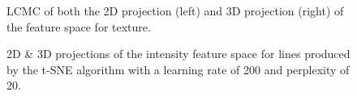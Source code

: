 \begin{figure}[H]
	\centering
	\caption{LCMC of both the 2D projection (left) and 3D projection (right) of the feature space for texture.}\label{fig:LCMC_texture}
\end{figure}
\clearpage


\clearpage
\begin{figure}[H]
	\centering
	\caption{2D \& 3D projections of the intensity feature space for lines produced by the t-SNE algorithm with a learning rate of 200 and perplexity of 20.}\label{fig:intensity_SNE_mapping_lines}
\end{figure}

